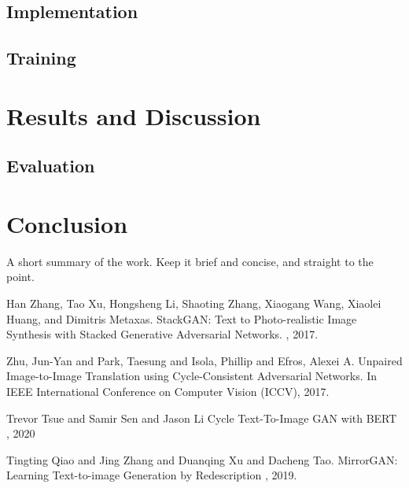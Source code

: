 \documentclass{article}
\begin{document}
	\subsection{Implementation}
	
	\subsection{Training}

	\section{Results and Discussion}
	

	\subsection{Evaluation}	


	\section{Conclusion}

	    A short summary of the work. Keep it brief and concise, and straight to the point.


	  
	
	
	\begin{thebibliography}{1}
		Han Zhang, Tao Xu, Hongsheng Li, Shaoting Zhang, Xiaogang Wang, Xiaolei Huang, and 
		Dimitris Metaxas.
		\newblock StackGAN: Text to Photo-realistic Image Synthesis with Stacked 
		Generative Adversarial Networks.
		, 2017.
		

		Zhu, Jun-Yan and Park, Taesung and Isola, Phillip and Efros, Alexei A.
		\newblock Unpaired Image-to-Image Translation using Cycle-Consistent Adversarial Networks.
		\newblock In IEEE International Conference on Computer Vision (ICCV), 2017.

		Trevor Tsue and Samir Sen and Jason Li
		\newblock Cycle Text-To-Image GAN with BERT
		, 2020
		
		Tingting Qiao and Jing Zhang and Duanqing Xu and Dacheng Tao.
		\newblock MirrorGAN: Learning Text-to-image Generation by Redescription
		, 2019.
		
	\end{thebibliography}
	
	
\end{document}
